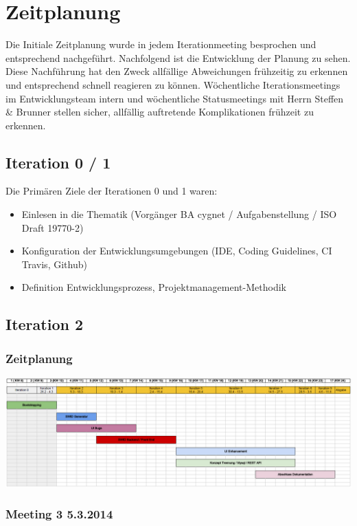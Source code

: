 \chapter{Zeitplanung}

Die Initiale Zeitplanung wurde in jedem Iterationmeeting besprochen und
entsprechend nachgeführt. Nachfolgend ist die Entwicklung der Planung zu sehen.
Diese Nachführung hat den Zweck allfällige Abweichungen frühzeitig zu erkennen
und entsprechend schnell reagieren zu können. Wöchentliche Iterationsmeetings im
Entwicklungsteam intern und wöchentliche Statusmeetings mit Herrn Steffen \&
Brunner stellen sicher, allfällig auftretende Komplikationen frühzeit zu
erkennen.


\section{Iteration 0 / 1}
Die Primären Ziele der Iterationen 0 und 1 waren:
\begin{itemize}
\item Einlesen in die Thematik (Vorgänger BA cygnet / Aufgabenstellung / ISO Draft 19770-2)
\item Konfiguration der Entwicklungsumgebungen (IDE, Coding Guidelines, CI Travis, Github)
\item Definition Entwicklungsprozess, Projektmanagement-Methodik
\end{itemize}

\section{Iteration 2}
\subsection{Zeitplanung}
\includegraphics[width=\textwidth]{images/zeitplanung/Iteration1_2.jpg}
\subsection{Meeting 3 5.3.2014}
